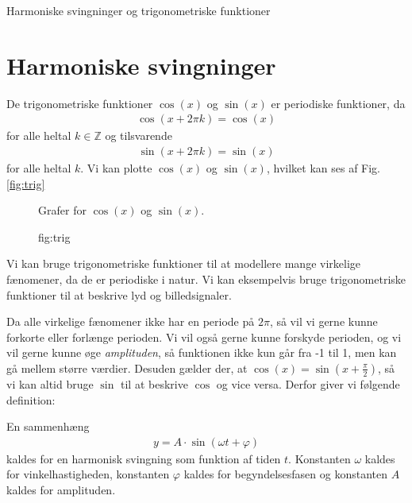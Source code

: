 \begin{center}
\Huge
Harmoniske svingninger og trigonometriske funktioner
\end{center}

\section*{Harmoniske svingninger}

De trigonometriske funktioner $\cos(x)$ og $\sin(x)$ er periodiske funktioner, da 
\begin{align*}
\cos(x + 2\pi k) = \cos(x) 
\end{align*}
for alle heltal $k\in \mathbb{Z}$ og tilsvarende
\begin{align*}
\sin(x + 2\pi k) = \sin(x)
\end{align*}
for alle heltal $k$. Vi kan plotte $\cos(x)$ og $\sin(x)$, hvilket kan ses af Fig. \ref{fig:trig}
\begin{figure}[H]
\centering
{}
\caption{Grafer for $\cos(x)$ og $\sin(x)$.}
\caption{fig:trig}
\end{figure}
Vi kan bruge trigonometriske funktioner til at modellere mange virkelige fænomener, da de er periodiske i natur. Vi kan eksempelvis bruge trigonometriske funktioner til at beskrive lyd og billedsignaler.

Da alle virkelige fænomener ikke har en periode på $2\pi$, så vil vi gerne kunne forkorte eller forlænge perioden. Vi vil også gerne kunne forskyde perioden, og vi vil gerne kunne øge \textit{amplituden}, så funktionen ikke kun går fra -1 til 1, men kan gå mellem større værdier. Desuden gælder der, at $\cos(x) = \sin(x + \frac{\pi}{2})$, så vi kan altid bruge $\sin$ til at beskrive $\cos$ og vice versa. Derfor giver vi følgende definition:
\begin{defn}
En sammenhæng 
\begin{align*}
y = A\cdot \sin(\omega t + \varphi)
\end{align*}
kaldes for en harmonisk svingning som funktion af tiden $t$. Konstanten $\omega$ kaldes for vinkelhastigheden, konstanten $\varphi$ kaldes for begyndelsesfasen og konstanten $A$ kaldes for amplituden. 
\end{defn}

